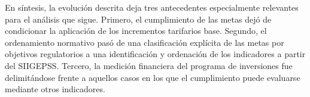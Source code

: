 En síntesis, la evolución descrita deja tres antecedentes especialmente relevantes para el análisis que sigue. Primero, el cumplimiento de las metas dejó de condicionar la aplicación de los incrementos tarifarios base. Segundo, el ordenamiento normativo pasó de una clasificación explícita de las metas por objetivos regulatorios a una identificación y ordenación de los indicadores a partir del SIIGEPSS. Tercero, la medición financiera del programa de inversiones fue delimitándose frente a aquellos casos en los que el cumplimiento puede evaluarse mediante otros indicadores.